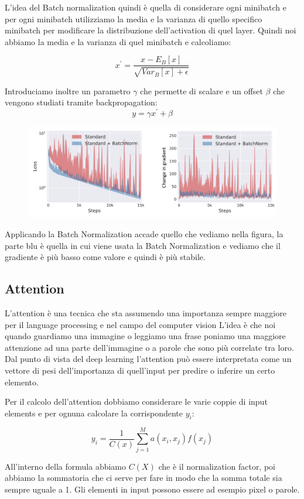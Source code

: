 \documentclass[14pt]{extreport}
\begin{document}
L'idea del Batch normalization quindi è quella di considerare ogni minibatch e per ogni minibatch utilizziamo 
la media e la varianza di quello specifico minibatch per modificare la distribuzione dell'activation di quel layer.
Quindi noi abbiamo la media e la varianza di quel minibatch e calcoliamo:

$$x^{'} = \frac{x-E_B[x]}{\sqrt{Var_B[x]+\epsilon}}$$

Introduciamo inoltre un parametro $\gamma$ che permette di scalare e un offset $\beta$ che vengono studiati tramite backpropagation:
$$y = \gamma x^{'} + \beta$$

\begin{figure}[H]
\centering
\includegraphics[width=0.7\linewidth]{430.jpeg}
\end{figure}

Applicando la Batch Normalization accade quello che vediamo nella figura, la parte blu è quella
in cui viene usata la Batch Normalization e vediamo che il gradiente è più basso come valore e quindi è più stabile.


\subsection{Attention}

L'attention è una tecnica che sta assumendo una importanza sempre maggiore per il language processing e nel campo del computer vision
L'idea è che noi quando guardiamo una immagine o leggiamo una frase poniamo una maggiore attenzione ad una parte dell'immagine o a parole che sono
più correlate tra loro.
Dal punto di vista del deep learning l'attention può essere interpretata come un vettore di pesi dell'importanza di quell'input
per predire o inferire un certo elemento.

Per il calcolo dell'attention dobbiamo considerare le varie coppie di input elements e per ognuna calcolare
la corrispondente $y_i$:

$$y_i = \frac{1}{C(x)}\sum_{j=1}^M a(x_i,x_j)f(x_j)$$

All'interno della formula abbiamo $C(X)$ che è il normalization factor, poi abbiamo la sommatoria che ci serve per fare in modo che la somma totale sia sempre
uguale a 1. Gli elementi in input possono essere ad esempio pixel o parole.
\end{document}
